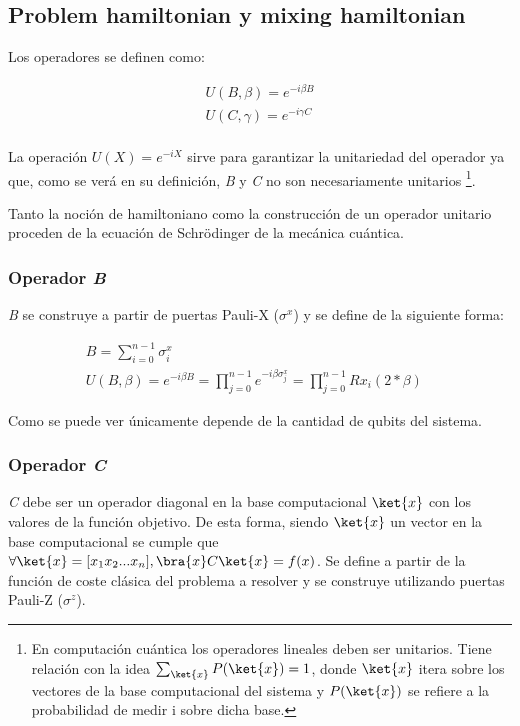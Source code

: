 \subsection{Problem hamiltonian y mixing hamiltonian}

Los operadores se definen como:

\begin{align*}
  U(B, \beta) = e^{-i \beta B} \\
  U(C, \gamma) = e^{-i \gamma C} \\
\end{align*}

La operación \(U(X) = e^{-i X}\) sirve para garantizar la unitariedad del operador ya que, como se verá en su definición, \textit{B} y \textit{C} no son necesariamente unitarios
\footnote{En computación cuántica los operadores lineales deben ser unitarios. Tiene relación con la idea
  $\sum_{\ket{x}} {P(\ket{x})} = 1$,
  donde $\ket{x}$ itera sobre los vectores de la base computacional del sistema y
  \(P(\ket{x})\) se refiere a la probabilidad de medir i sobre dicha base.}.

Tanto la noción de hamiltoniano como la construcción de un operador unitario proceden de la ecuación de Schrödinger de la mecánica cuántica.

\subsubsection{Operador \textit{B}}
\textit{B} se construye a partir de puertas Pauli-X ($\sigma^x$) y se define de la siguiente forma:

\begin{align*}
  &B = \sum_{i=0}^{n-1}\sigma^x_{i} &&\\
  &U(B, \beta) = e^{-i \beta B} = \prod_{j=0}^{n-1}e^{-i \beta \sigma^x_j} = \prod_{j=0}^{n-1}Rx_i(2*\beta)  %
\end{align*}

Como se puede ver únicamente depende de la cantidad de qubits del sistema.

\subsubsection{Operador \textit{C}}
\label{sec:3-operador c}
\textit{C} debe ser un operador diagonal  %
en la base computacional \(\ket{x}\) con los valores de la función objetivo. De esta forma, siendo \(\ket{x}\) un vector en la base computacional se cumple que \(\forall \ket{x} = [x_1x_2...x_n], \bra{x}C\ket{x} = f(x)\). Se define a partir de la función de coste clásica del problema a resolver y se construye utilizando puertas Pauli-Z ($\sigma^z$).

